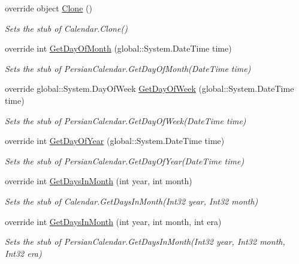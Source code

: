 \begin{DoxyCompactItemize}
override object \hyperlink{class_system_1_1_globalization_1_1_fakes_1_1_stub_persian_calendar_a01e68647bc6a209c35b53c5b19edb877}{Clone} ()
\begin{DoxyCompactList}\small\item\em Sets the stub of Calendar.\-Clone()\end{DoxyCompactList}\item 
override int \hyperlink{class_system_1_1_globalization_1_1_fakes_1_1_stub_persian_calendar_a0ff083c35f5b74a5a6c0e741728fc1c9}{Get\-Day\-Of\-Month} (global\-::\-System.\-Date\-Time time)
\begin{DoxyCompactList}\small\item\em Sets the stub of Persian\-Calendar.\-Get\-Day\-Of\-Month(\-Date\-Time time)\end{DoxyCompactList}\item 
override global\-::\-System.\-Day\-Of\-Week \hyperlink{class_system_1_1_globalization_1_1_fakes_1_1_stub_persian_calendar_a17eb5bc81b08d72905dcb3202258fbdc}{Get\-Day\-Of\-Week} (global\-::\-System.\-Date\-Time time)
\begin{DoxyCompactList}\small\item\em Sets the stub of Persian\-Calendar.\-Get\-Day\-Of\-Week(\-Date\-Time time)\end{DoxyCompactList}\item 
override int \hyperlink{class_system_1_1_globalization_1_1_fakes_1_1_stub_persian_calendar_ac3b58b94b3af6e0d3d5bed683c38e723}{Get\-Day\-Of\-Year} (global\-::\-System.\-Date\-Time time)
\begin{DoxyCompactList}\small\item\em Sets the stub of Persian\-Calendar.\-Get\-Day\-Of\-Year(\-Date\-Time time)\end{DoxyCompactList}\item 
override int \hyperlink{class_system_1_1_globalization_1_1_fakes_1_1_stub_persian_calendar_a2e86a95ace2d4c13e918cfeb7b14f463}{Get\-Days\-In\-Month} (int year, int month)
\begin{DoxyCompactList}\small\item\em Sets the stub of Calendar.\-Get\-Days\-In\-Month(\-Int32 year, Int32 month)\end{DoxyCompactList}\item 
override int \hyperlink{class_system_1_1_globalization_1_1_fakes_1_1_stub_persian_calendar_a5d4a78519c0e922bdf832ffe75c969f2}{Get\-Days\-In\-Month} (int year, int month, int era)
\begin{DoxyCompactList}\small\item\em Sets the stub of Persian\-Calendar.\-Get\-Days\-In\-Month(\-Int32 year, Int32 month, Int32 era)\end{DoxyCompactList}\item 

\end{DoxyCompactItemize}
